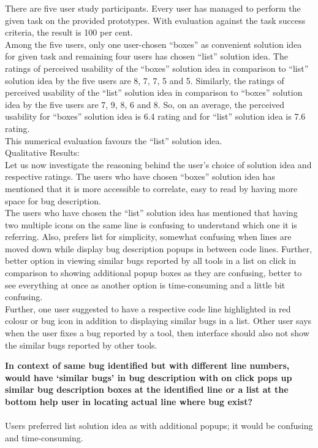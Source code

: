 There are five user study participants. Every user has managed to perform the given task on the provided prototypes. With evaluation against the task success criteria, the result is 100 per cent. \\

Among the five users, only one user-chosen “boxes” as convenient solution idea for given task and remaining four users has chosen “list” solution idea. The ratings of perceived usability of the “boxes” solution idea in comparison to “list” solution idea by the five users are 8, 7, 7, 5 and 5. Similarly, the ratings of perceived usability of the “list” solution idea in comparison to “boxes” solution idea by the five users are 7, 9, 8, 6 and 8. So, on an average, the perceived usability for “boxes” solution idea is 6.4 rating and for “list” solution idea is 7.6 rating. \\

This numerical evaluation favours the “list” solution idea. \\


Qualitative Results: \\

Let us now investigate the reasoning behind the user’s choice of solution idea and respective ratings. The users who have chosen “boxes” solution idea has mentioned that it is more accessible to correlate, easy to read by having more space for bug description. \\

The users who have chosen the “list” solution idea has mentioned that having two multiple icons on the same line is confusing to understand which one it is referring. Also, prefers list for simplicity, somewhat confusing when lines are moved down while display bug description popups in between code lines. Further,  better option in viewing similar bugs reported by all tools in a list on click in comparison to showing additional popup boxes as they are confusing, better to see everything at once as another option is time-consuming and a little bit confusing. \\

Further, one user suggested to have a respective code line highlighted in red colour or bug icon in addition to displaying similar bugs in a list. Other user says when the user fixes a bug reported by a tool, then interface should also not show the similar bugs reported by other tools. \\

\begin{myboxi}{{\textbf{In context of same bug identified but with different line numbers, would have ‘similar bugs’ in bug description with on click pops up similar bug description boxes at the identified line or a list at the bottom help user in locating actual line where bug exist?}}}
	\\ \\ Users preferred list solution idea as with additional popups; it would be confusing and time-consuming. \\
\end{myboxi}


